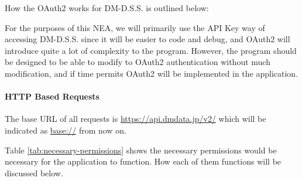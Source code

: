 How the OAuth2 works for DM-D.S.S. is outlined below:



For the purposes of this NEA, we will primarily use the API Key way of accessing DM-D.S.S. since it will be easier to code and debug, and OAuth2 will introduce quite a lot of complexity to the program. However, the program should be designed to be able to modify to OAuth2 authentication without much modification, and if time permits OAuth2 will be implemented in the application.

\paragraph{HTTP Based Requests}

The base URL of all requests is \url{https://api.dmdata.jp/v2/} which will be indicated as \url{base://} from now on.

Table \ref{tab:necessary-permissions} shows the necessary permissions would be necessary for the application to function. How each of them functions will be discussed below.

